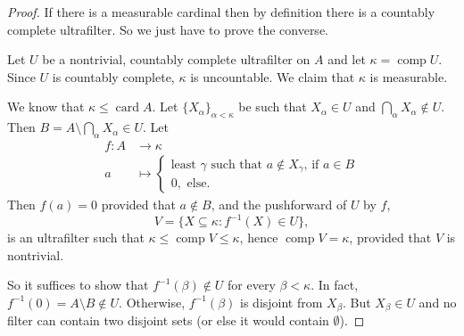 \documentclass[12pt]{report}
\newcommand{\card}{\operatorname{card}}
\DeclareMathOperator{\comp}{comp}
\theoremstyle{definition}
\begin{document}
\begin{proof}
If there is a measurable cardinal then by definition there is a countably complete ultrafilter. So we just have to prove the converse.

Let $U$ be a nontrivial, countably complete ultrafilter on $A$ and let $\kappa = \comp U$. Since $U$ is countably complete, $\kappa$ is uncountable. We claim that $\kappa$ is measurable.

We know that $\kappa \leq \card A$.
Let $\{X_\alpha\}_{\alpha < \kappa}$ be such that $X_\alpha \in U$ and $\bigcap_\alpha X_\alpha \notin U$. Then $B = A \setminus \bigcap_\alpha X_\alpha \in U$.
Let
\begin{align*}
f: A &\to \kappa\\
a &\mapsto \begin{cases}
\text{least $\gamma$ such that $a \notin X_\gamma$, if $a \in B$}\\
0,\text{ else.}
\end{cases}
\end{align*}
Then $f(a) = 0$ provided that $a \notin B$, and the pushforward of $U$ by $f$,
$$V = \{X \subseteq \kappa: f^{-1}(X) \in U\},$$
is an ultrafilter such that $\kappa \leq \comp V \leq \kappa$, hence $\comp V = \kappa$, provided that $V$ is nontrivial.

So it suffices to show that $f^{-1}(\beta) \notin U$ for every $\beta < \kappa$. In fact, $f^{-1}(0) = A \setminus B \notin U$. Otherwise, $f^{-1}(\beta)$ is disjoint from $X_\beta$. But $X_\beta \in U$ and no filter can contain two disjoint sets (or else it would contain $\emptyset$).
\end{proof}
\end{document}
